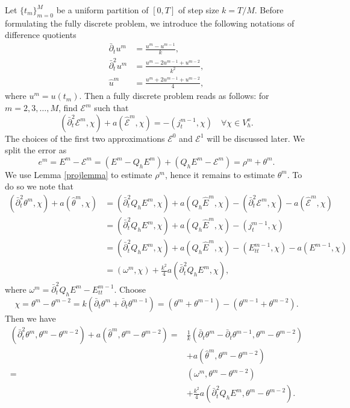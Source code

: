 \documentclass[reqno,a4paper]{amsart}
\theoremstyle{remark}
\numberwithin{equation}{section}
\def\dbart{\bar{\partial}_t}
\def\dbartt{\bar{\partial}_t^2}
\def\EE{\mathcal{E}}
\begin{document}
Let $ \{ t_m \}_{m=0}^{M} $ be a uniform partition of $ [0, T ] $ 
of step size $ k = T/M $.
Before formulating the fully discrete problem, 
we introduce the following notations of difference quotients 
\[
\begin{aligned}
\dbart u^m &= \frac{u^m - u^{m-1}}{k}, \\
\dbartt u^m &= \frac{u^m - 2 u^{m-1} + u^{m-2}}{k^2}, \\
\hat{u}^m &= \frac{u^m + 2 u^{m-1} + u^{m-2}}{4},
\end{aligned}
\]
where $ u^m = u(t_m ) $. Then a fully discrete problem reads as follows: 
for $ m = 2, 3, \ldots, M $, find $ \EE^m $ such that
\begin{equation} \label{TDNM0}
(\dbartt \EE^m, \chi) + a(\hat{\EE}^m, \chi) = -(j_t^{m - 1}, \chi) \quad \forall \chi \in V^x_h.
\end{equation}
The choices of the first two approximations 
$ \EE^0 $ and $ \EE^1 $ will be discussed later.
We split the error as 
\[
e^m = E^m - \EE^m = (E^m - Q_h E^m) + (Q_h E^m - \EE^m) = \rho^m + \theta^m.
\]
We use Lemma \ref{projlemma} to estimate $ \rho^m $,
hence it remains to estimate $ \theta^m $.
To do so we note that
\[
\begin{aligned}
( \dbartt \theta^m, \chi)  + a( \hat{\theta}^m, \chi) &=
( \dbartt Q_h E^m, \chi) + a(Q_h \hat{E}^m, \chi) - 
( \dbartt \EE^m, \chi) - a( \hat{\EE}^m, \chi) \\
&= ( \dbartt Q_h E^m, \chi) + a(Q_h \hat{E}^m, \chi) - (j_t^{m - 1}, \chi) \\
&= ( \dbartt Q_h E^m, \chi) + a(Q_h \hat{E}^m, \chi) -
(E_{tt}^{m - 1}, \chi) - a(E^{m - 1}, \chi) \\
&= ( \omega^m, \chi) + \frac{k^2}{4} a(\dbartt Q_h E^m, \chi),
\end{aligned}
\]
where $ \omega^m = \dbartt Q_h E^m - E_{tt}^{m - 1} $.
Choose
\[
\chi = \theta^m - \theta^{m - 2} = k(\dbart \theta^m + \dbart \theta^{m - 1})
= (\theta^m + \theta^{m - 1}) - ( \theta^{m - 1} + \theta^{ m -2}).
\]
Then we have
\begin{equation}
\begin{aligned} \label{TDNM1}
( \dbartt \theta^m, \theta^m - \theta^{m - 2})  + a( \hat{\theta}^m, \theta^m - \theta^{m - 2})
=&\frac{1}{k} (\dbart \theta^m - \dbart \theta^{m - 1}, \theta^m - \theta^{m - 2}) \\
&+ a(\hat{\theta}^m, \theta^m - \theta^{m - 2}) \\
=& ( \omega^m, \theta^m - \theta^{m - 2}) \\
&+ \frac{k^2}{4} a(\dbartt Q_h E^m, \theta^m - \theta^{m - 2}).
\end{aligned}
\end{equation}
\end{document}
